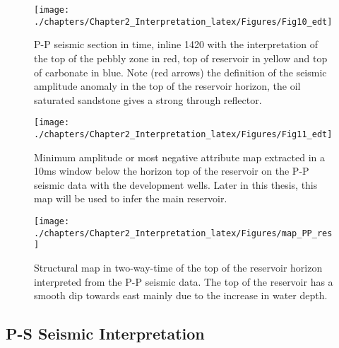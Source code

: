 \begin{figure}[hbtp]
	\begin{center}
	\texttt{[image: ./chapters/Chapter2\_Interpretation\_latex/Figures/Fig10\_edt]}
			\caption[P-P seismic section in time, inline 1420 with the interpretation of the top of the pebbly zone, top of reservoir and top of carbonate.]{P-P seismic section in time, inline 1420 with the interpretation of the top of the pebbly zone in red, top of reservoir in yellow and top of carbonate in blue. Note (red arrows) the definition of the seismic amplitude anomaly in the top of the reservoir horizon, the oil saturated sandstone gives a strong through reflector. }
			\label{fig:Iline1420_PP}
		\end{center}
	\end{figure}		
	
\begin{figure}[hbtp]
	\begin{center}
	\texttt{[image: ./chapters/Chapter2\_Interpretation\_latex/Figures/Fig11\_edt]}
			\caption[Minimum amplitude or most negative attribute map extracted in a 10ms window at the horizon top of the reservoir on the P-P seismic data with the development wells.]{Minimum amplitude or most negative attribute map extracted in a 10ms window below the horizon top of the reservoir on the P-P seismic data with the development wells. Later in this thesis, this map will be used to infer the main reservoir. }
			\label{fig:map_res_amp}
		\end{center}
	\end{figure}
	
\begin{figure}[hbtp]
	\begin{center}
	\texttt{[image: ./chapters/Chapter2\_Interpretation\_latex/Figures/map\_PP\_res]}
			\caption[ Structural map in two-way-time of the top of the reservoir horizon interpreted from the P-P seismic data.]{Structural map in two-way-time of the top of the reservoir horizon interpreted from the P-P seismic data. The top of the reservoir has a smooth dip towards east mainly due to the increase in water depth. }
			\label{fig:map_res_PP}
		\end{center}
	\end{figure}
	

\subsection{P-S Seismic Interpretation}

